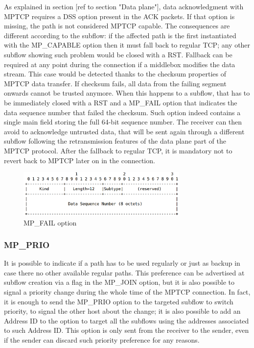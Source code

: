 As explained in section [ref to section "Data plane"], data acknowledgment with MPTCP requires a DSS option present in the ACK packets. If that option is missing, the path is not considered MPTCP capable. The consequences are different according to the subflow: if the affected path is the first instantiated with the MP\_CAPABLE option then it must fall back to regular TCP; any other subflow showing such problem would be closed with a RST. 
Fallback can be required at any point during the connection if a middlebox modifies the data stream. This case would be detected thanks to the checksum properties of MPTCP data transfer. If checksum fails, all data from the failing segment onwards cannot be trusted anymore. When this happens to a subflow, that has to be immediately closed with a RST and a MP\_FAIL option that indicates the data sequence number that failed the checksum. Such option indeed contains a single main field storing the full 64-bit sequence number. The receiver can then avoid to acknowledge untrusted data, that will be sent again through a different subflow following the retransmission features of the data plane part of the MPTCP protocol. After the fallback to regular TCP, it is mandatory not to revert back to MPTCP later on in the connection.


\begin{figure}[!htb]
\centering
\includegraphics[width=0.75\textwidth]{images/opt_fail}
\caption{MP\_FAIL option}
\label{fig:opt_fail}
\end{figure}

\subsubsection{MP\_PRIO}
It is possible to indicate if a path has to be used regularly or just as backup in case there no other available regular paths. This preference can be advertised at subflow creation via a flag in the MP\_JOIN option, but it is also possible to signal a priority change during the whole time of the MPTCP connection. In fact, it is enough to send the MP\_PRIO option to the targeted subflow to switch priority, to signal the other host about the change; it is also possible to add an Address ID to the option to target all the subflows using the addresses associated to such Address ID. This option is only sent from the receiver to the sender, even if the sender can discard such priority preference for any reasons. 


